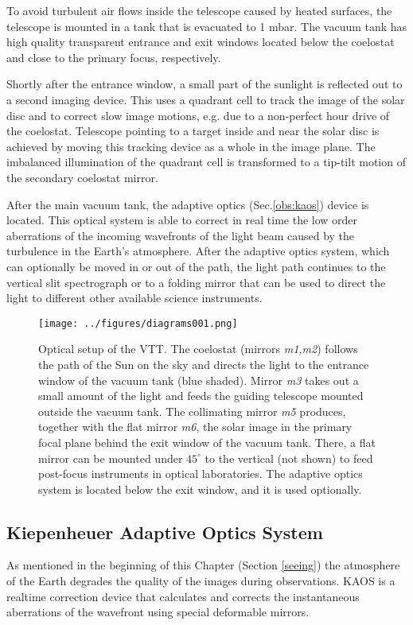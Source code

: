 To avoid turbulent air flows inside the telescope caused by heated surfaces, the telescope is mounted in a tank that is evacuated to 1 mbar. The vacuum tank has high quality transparent entrance and exit windows located below the coelostat and close to the primary focus, respectively.

Shortly after the entrance window, a small part of the sunlight is reflected out to a second imaging device. This uses a quadrant cell to track the image of the solar disc and to correct slow image motions, e.g. due to a non-perfect hour drive of the coelostat. Telescope pointing to a target inside and near the solar disc is achieved by moving this tracking device as a whole in the image plane. The imbalanced illumination of the quadrant cell is transformed to a tip-tilt motion of the secondary coelostat mirror.

After the main vacuum tank, the adaptive optics (Sec.\ref{obs:kaos}) device is located. This optical system is able to correct in real time the low order aberrations of the incoming wavefronts of the light beam caused by the turbulence in the Earth's atmosphere. After the adaptive optics system, which can optionally be moved in or out of the path, the light path continues to the vertical slit spectrograph or to a folding mirror that can be used to direct the light to different other available science instruments.
\begin{figure}[t]
\begin{center}
\texttt{[image: ../figures/diagrams001.png]}
\caption{Optical setup of the VTT. The coelostat (mirrors \emph{m1,m2}) follows the path of the Sun on the sky and directs the light to the entrance window of the vacuum tank (blue shaded). Mirror \emph{m3} takes out a small amount of the light and feeds the guiding telescope mounted outside the vacuum tank. The collimating mirror \emph{m5} produces, together with the flat mirror \emph{m6}, the solar image in the primary focal plane behind the exit window of the vacuum tank. There, a flat mirror can be mounted under $45^{\circ}$ to the vertical (not shown) to feed post-focus instruments in optical laboratories. The adaptive optics system is located below the exit window, and it is used optionally. }
\label{fig:vtt:optical}
\end{center}
\end{figure}


\subsection{Kiepenheuer Adaptive Optics System\label{obs:kaos}}
As mentioned in the beginning of this Chapter (Section \ref{seeing}) the atmosphere of the Earth degrades the quality of the images during observations. KAOS \citep[Kiepenheuer Adaptive Optics System, ][]{2003SPIE.4853..187V,2007msfa.conf..107B} is a realtime correction device that calculates and corrects the instantaneous aberrations of the wavefront using special deformable mirrors.

